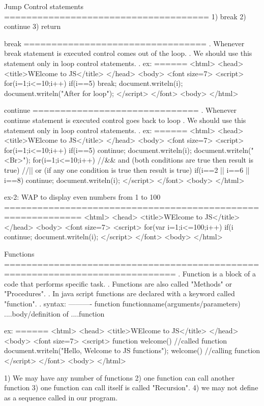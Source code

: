 Jump Control statements
=====================================
1) break
2) continue
3) return

break
=================================
. Whenever break statement is executed control comes out of the loop.
. We should use this statement only in loop control statements.
. ex:
======
<html>
  <head>
   <title>WElcome to JS</title>
  </head>
  <body>
    <font size=7>
     <script>
	   for(i=1;i<=10;i++)
	   {
		   if(i==5)
		      break;
		   document.writeln(i);
	   }
	   document.writeln("After for loop");
	</script>
   </font>
  <body>
</html>

continue
==============================
. Whenever continue statement is executed control goes back to loop
. We should use this statement only in loop control statements.
. ex:
======
<html>
  <head>
   <title>WElcome to JS</title>
  </head>
  <body>
    <font size=7>
     <script>
	   for(i=1;i<=10;i++)
	   {
		   if(i==5)
		      continue;
		   document.writeln(i);
	   }
		document.writeln("<Br>");
	   for(i=1;i<=10;i++)
	   {
		   //&& and (both conditions are true then result is true)
		   //|| or  (if any one condition is true then result is true)
		   if(i==2 || i==6 || i==8)
		      continue;
		   document.writeln(i);
	   }
	</script>
   </font>
  <body>
</html>

ex-2: WAP to display even numbers from 1 to 100
============================================================
<html>
  <head>
   <title>WElcome to JS</title>
  </head>
  <body>
    <font size=7>
     <script>
	   for(var i=1;i<=100;i++)
	   {
		   if(i%
		       continue;
		   document.writeln(i);
	   }
	</script>
   </font>
  <body>
</html>

Functions
=============================================================================
. Function is a block of a code that performs specific task.
. Functions are also called "Methods" or "Procedures".
. In java script functions are declared with a keyword called "function".
. syntax:
----------
   function functionname(arguments/parameters)
   {
     ....body/definition of 
     ....function
   }

ex:
======
<html>
  <head>
   <title>WElcome to JS</title>
  </head>
  <body>
    <font size=7>
     <script>
	   function welcome() //called function
	   {
		   document.writeln("Hello, Welcome to JS functions");
	   }
	   welcome() //calling function
	</script>
   </font>
  <body>
</html>

1) We may have any number of functions
2) one function can call another function
3) one function can call itself is called "Recursion".
4) we may not define as a sequence called in our program.

